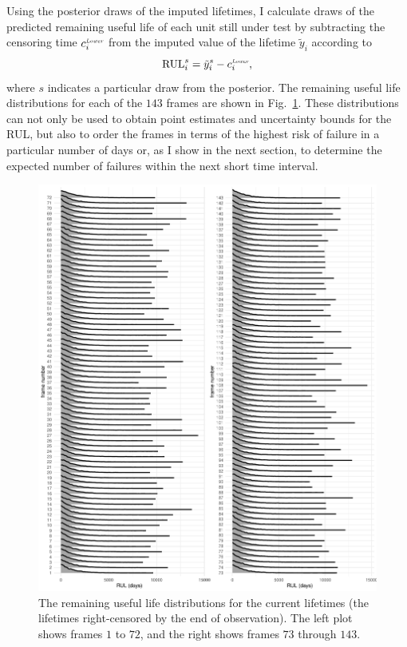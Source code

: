 Using the posterior draws of the imputed lifetimes, I calculate draws of the predicted remaining useful life of each unit still under test by subtracting the censoring time $c^{\textit{\tiny{Lower}}}_i$ from the imputed value of the lifetime $\tilde{y}_{i}$ according to
\begin{equation} \label{eq:idler-rul}
  \hbox{RUL}^s_i  = \tilde{y}_{i}^s - c^{\textit{\tiny{Lower}}}_i,
\end{equation}
where $s$ indicates a particular draw from the posterior. The remaining useful life distributions for each of the $143$ frames are shown in Fig.~\ref{fig:idler-FTs}. These distributions can not only be used to obtain point estimates and uncertainty bounds for the RUL, but also to order the frames in terms of the highest risk of failure in a particular number of days or, as I show in the next section, to determine the expected number of failures within the next short time interval.

\begin{figure}
  \centering
  \includegraphics[width=1\textwidth]{./figures/ch-3/posterior-FTs.pdf}
  \caption{The remaining useful life distributions for the current lifetimes (the lifetimes right-censored by the end of observation). The left plot shows frames $1$ to $72$, and the right shows frames $73$ through $143$.}
  \label{fig:idler-FTs}
\end{figure}

